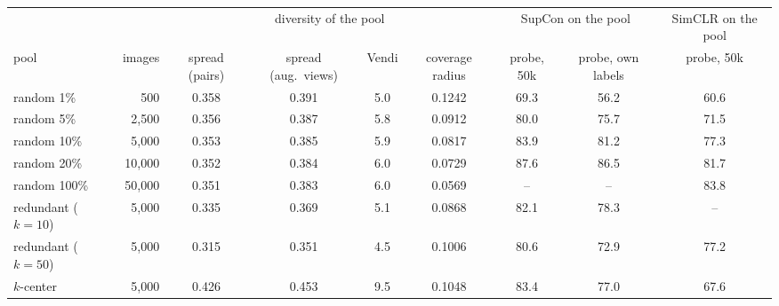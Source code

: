 \begin{tabular}{l r cccc cc c}
\toprule
 & & \multicolumn{4}{c}{diversity of the pool} & \multicolumn{2}{c}{SupCon on the pool} & SimCLR on the pool \\
\cmidrule(lr){3-6}\cmidrule(lr){7-8}\cmidrule(lr){9-9}
pool & images & spread (pairs) & spread (aug.\ views) & Vendi & coverage radius & probe, 50k & probe, own labels & probe, 50k \\
\midrule
random 1\% & 500 & 0.358 & 0.391 & 5.0 & 0.1242 & 69.3 & 56.2 & 60.6 \\
random 5\% & 2,500 & 0.356 & 0.387 & 5.8 & 0.0912 & 80.0 & 75.7 & 71.5 \\
random 10\% & 5,000 & 0.353 & 0.385 & 5.9 & 0.0817 & 83.9 & 81.2 & 77.3 \\
random 20\% & 10,000 & 0.352 & 0.384 & 6.0 & 0.0729 & 87.6 & 86.5 & 81.7 \\
random 100\% & 50,000 & 0.351 & 0.383 & 6.0 & 0.0569 & -- & -- & 83.8 \\
redundant ($k{=}10$) & 5,000 & 0.335 & 0.369 & 5.1 & 0.0868 & 82.1 & 78.3 & -- \\
redundant ($k{=}50$) & 5,000 & 0.315 & 0.351 & 4.5 & 0.1006 & 80.6 & 72.9 & 77.2 \\
$k$-center & 5,000 & 0.426 & 0.453 & 9.5 & 0.1048 & 83.4 & 77.0 & 67.6 \\
\bottomrule
\end{tabular}
